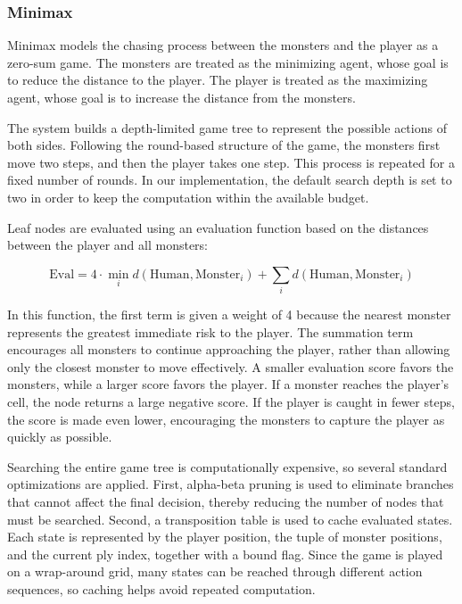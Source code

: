 \subsubsection{Minimax}

Minimax models the chasing process between the monsters and the player as a 
zero-sum game. The monsters are treated as the minimizing agent, whose goal is to 
reduce the distance to the player. The player is treated as the maximizing agent, 
whose goal is to increase the distance from the monsters.

The system builds a depth-limited game tree to represent the possible actions of 
both sides. Following the round-based structure of the game, the monsters first 
move two steps, and then the player takes one step. This process is repeated for 
a fixed number of rounds. In our implementation, the default search depth is set 
to two in order to keep the computation within the available budget.

Leaf nodes are evaluated using an evaluation function based on the distances 
between the player and all monsters:

\[
\text{Eval} = 4 \cdot \min_i d(\text{Human}, \text{Monster}_i)
+ \sum_i d(\text{Human}, \text{Monster}_i)
\]

In this function, the first term is given a weight of 4 because the nearest 
monster represents the greatest immediate risk to the player. The summation term 
encourages all monsters to continue approaching the player, rather than allowing 
only the closest monster to move effectively. A smaller evaluation score favors 
the monsters, while a larger score favors the player. If a monster reaches the 
player's cell, the node returns a large negative score. If the player is caught 
in fewer steps, the score is made even lower, encouraging the monsters to capture 
the player as quickly as possible.

Searching the entire game tree is computationally expensive, so several standard 
optimizations are applied. First, alpha-beta pruning is used to eliminate branches 
that cannot affect the final decision, thereby reducing the number of nodes that 
must be searched. Second, a transposition table is used to cache evaluated states. 
Each state is represented by the player position, the tuple of monster positions, 
and the current ply index, together with a bound flag. Since the game is played 
on a wrap-around grid, many states can be reached through different action 
sequences, so caching helps avoid repeated computation.

